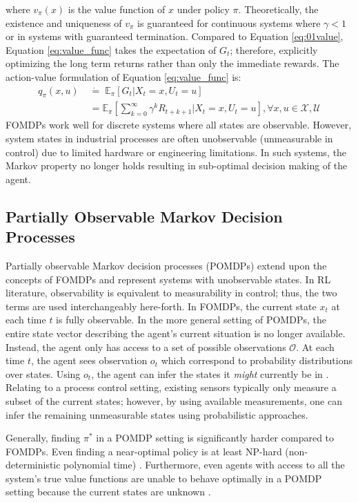 where $v_\pi (x)$ is the value function of $x$ under policy $\pi$. Theoretically, the existence and uniqueness of $v_{\pi}$ is guaranteed for continuous systems where $\gamma < 1$ or in systems with guaranteed termination.  Compared to Equation \ref{eq:01value}, Equation \ref{eq:value_func} takes the expectation of $G_t$; therefore, explicitly optimizing the long term returns rather than only the immediate rewards. The action-value formulation of Equation \ref{eq:value_func} is:
\begin{align}
    q_\pi (x, u) \; &\dot{=} \; \mathbb{E}_\pi [G_t | X_t = x, U_t = u] \\
                 &= \mathbb{E}_\pi \left[\sum\limits^\infty_{k=0} \gamma^k R_{t+k+1} | X_t = x, U_t = u \right], \forall x, u \in \mathcal{X, U}
    \label{eq:a_value_func}
\end{align}
FOMDPs work well for discrete systems where all states are observable.  However, system states in industrial processes are often unobservable (unmeasurable in control) due to limited hardware or engineering limitations. In such systems, the Markov property no longer holds resulting in sub-optimal decision making of the agent.





\subsection{Partially Observable Markov Decision Processes}
Partially observable Markov decision processes (POMDPs) extend upon the concepts of FOMDPs and represent systems with unobservable states. In RL literature, observability is equivalent to measurability in control; thus, the two terms are used interchangeably here-forth. In FOMDPs, the current state $x_t$ at each time $t$ is fully observable. In the more general setting of POMDPs, the entire state vector describing the agent's current situation is no longer available. Instead, the agent only has access to a set of possible observations $\mathcal{O}$. At each time $t$, the agent sees observation $o_t$ which correspond to probability distributions over states.  Using $o_t$, the agent can infer the states it \textit{might} currently be in \cite{ng_ref12}. Relating to a process control setting, existing sensors typically only measure a subset of the current states; however, by using available measurements, one can infer the remaining unmeasurable states using probabilistic approaches.

Generally, finding $\pi^*$ in a POMDP setting is significantly harder compared to FOMDPs.  Even finding a near-optimal policy is at least NP-hard (non-deterministic polynomial time) \cite{pomdp_time}.  Furthermore, even agents with access to all the system's true value functions are unable to behave optimally in a POMDP setting because the current states are unknown \cite{ng_ref12}. 

